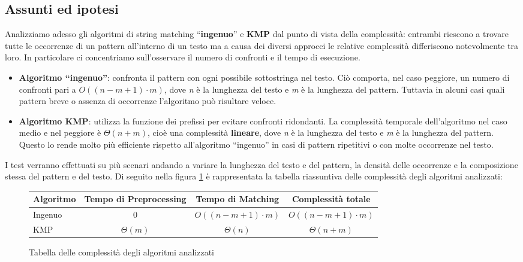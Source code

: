 \documentclass{article}
\begin{document}
\subsection{Assunti ed ipotesi}
Analizziamo adesso gli algoritmi di string matching ``\textbf{ingenuo}'' e \textbf{KMP} dal punto di vista della complessità: entrambi riescono a trovare tutte le occorrenze di un pattern all'interno di un testo ma a causa dei diversi approcci le relative complessità differiscono notevolmente tra loro. In particolare ci concentriamo sull'osservare il numero di confronti e il tempo di esecuzione.
\begin{itemize}
    \item \textbf{Algoritmo ``ingenuo''}: confronta il pattern con ogni possibile sottostringa nel testo. Ciò comporta, nel caso peggiore, un numero di confronti pari a $O((n - m + 1) \cdot m)$, dove \textit{n} è la lunghezza del testo e \textit{m} è la lunghezza del pattern. Tuttavia in alcuni casi quali pattern breve o assenza di occorrenze l'algoritmo può risultare veloce.
    \item \textbf{Algoritmo KMP}: utilizza la funzione dei prefissi per evitare confronti ridondanti. La complessità temporale dell'algoritmo nel caso medio e nel peggiore è $\Theta(n + m)$, cioè una complessità \textbf{lineare}, dove \textit{n} è la lunghezza del testo e \textit{m} è la lunghezza del pattern. Questo lo rende molto più efficiente rispetto all'algoritmo ``ingenuo'' in casi di pattern ripetitivi o con molte occorrenze nel testo.
\end{itemize}
I test verranno effettuati su più scenari andando a variare la lunghezza del testo e del pattern, la densità delle occorrenze e la composizione stessa del pattern e del testo.
\newpage
\noindent Di seguito nella figura \ref{tab:complexity-table} è rappresentata la tabella riassuntiva delle complessità degli algoritmi analizzati:
\begin{figure}[H]
    \begin{table}[H]
        \centering
        \begin{tabular}{>{\raggedright\arraybackslash}p{2cm}ccc}
            Algoritmo & Tempo di Preprocessing & Tempo di Matching        & Complessità totale       \\
            \midrule
            Ingenuo   & 0                      & $O((n - m + 1) \cdot m)$ & $O((n - m + 1) \cdot m)$ \\
            KMP       & $\Theta(m)$            & $\Theta(n)$              & $\Theta(n + m)$          \\
        \end{tabular}
    \end{table}
    \caption{Tabella delle complessità degli algoritmi analizzati}
    \label{tab:complexity-table}
\end{figure}
\end{document}
